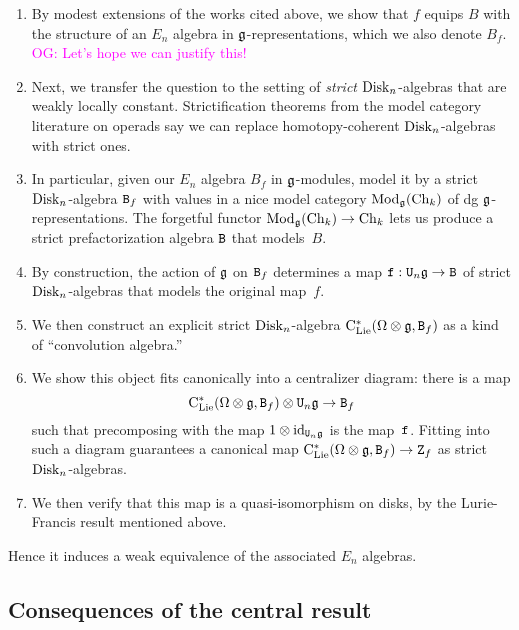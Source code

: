 \documentclass[11pt]{amsart}
\numberwithin{equation}{section}
\def\owen{\textcolor{magenta}{OG: }\textcolor{magenta}}
\begin{document}
\begin{enumerate}
\item By modest extensions of the works cited above, we show that  $f$ equips $B$ with the structure of an $E_n$ algebra in $\mathfrak g$-representations, which we also denote $B_f$. \owen{Let's hope we can justify this!}
\item Next, we transfer the question to the setting of {\em strict} ${\rm Disk}_n$-algebras that are weakly locally constant. 
Strictification theorems from the model category literature on operads say we can replace homotopy-coherent ${\rm Disk}_n$-algebras with strict ones. 
\item  In particular, given our $E_n$ algebra $B_f$ in $\mathfrak g$-modules, model it by a strict ${\rm Disk}_n$-algebra ${\tt B}_f$ with values in a nice model category ${\rm Mod}_\mathfrak g({\rm Ch}_k)$ of dg $\mathfrak g$-representations.
The forgetful functor ${\rm Mod}_\mathfrak g({\rm Ch}_k) \to {\rm Ch}_k$ lets us produce a strict prefactorization algebra ${\tt B}$ that models~$B$.
\item By construction, the action of $\mathfrak g$ on ${\tt B}_f$ determines a map ${\tt f}:  {\tt U}_n \mathfrak g \to {\tt B}$ of strict ${\rm Disk}_n$-algebras that models the original map~$f$.
\item We then construct an explicit strict ${\rm Disk}_n$-algebra ${\rm C}_{\rm Lie}^*(\Omega \otimes \mathfrak g, {\tt B}_f)$ as a kind of ``convolution algebra.'' 
\item We show this object fits canonically into a centralizer diagram: there is a map
\[
{\rm C}_{\rm Lie}^*(\Omega \otimes \mathfrak g, {\tt B}_f) \otimes {\tt U}_n \mathfrak g \to {\tt B}_f
\]
such that precomposing with the map $1 \otimes {\rm id}_{{\tt U}_n \mathfrak g}$ is the map~${\tt f}$.
Fitting into such a diagram guarantees a canonical map ${\rm C}_{\rm Lie}^*(\Omega \otimes \mathfrak g, {\tt B}_f) \to {\tt Z}_f$ as strict ${\rm Disk}_n$-algebras. 
\item We then verify that this map is a quasi-isomorphism on disks, by the Lurie-Francis result mentioned above. 
\end{enumerate}
Hence it induces a weak equivalence of the associated $E_n$ algebras. 

\subsection{Consequences of the central result}
\end{document}
